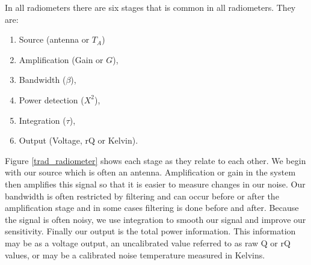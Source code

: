 
In all radiometers there are six stages that is common in all radiometers.  They are:

\begin{enumerate}
\item Source (antenna or $T_{A}$)
\item Amplification (Gain or $G$),
\item Bandwidth ($\beta$),
\item Power detection ($X^{2}$),
\item Integration ($\tau$),
\item Output (Voltage, rQ or Kelvin).
\end{enumerate}

Figure \ref{trad_radiometer} shows each stage as they relate to each other.  We begin with our source which is often an antenna.  Amplification or gain in the system then amplifies this signal so that it is easier to measure changes in our noise.  Our bandwidth is often restricted by filtering and can occur before or after the amplification stage and in some cases filtering is done before and after.  Because the signal is often noisy, we use integration to smooth our signal and improve our sensitivity.  Finally our output is the total power information.  This information may be as a voltage output, an uncalibrated value referred to as raw Q or rQ values, or may be a calibrated noise temperature measured in Kelvins.

